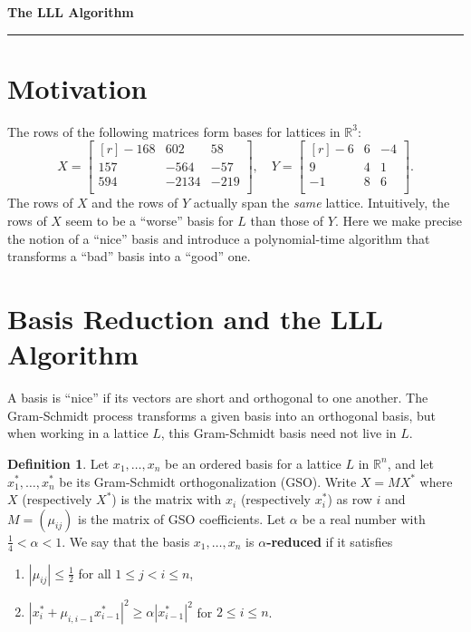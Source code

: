 \documentclass[11pt,letterpaper]{article}
\newcommand{\reals}{\mathbb{R}}
\theoremstyle{definition}
\newtheorem{definition}{Definition}[section]
\begin{document}
\begin{center}
{\bf \Large The LLL Algorithm} %
\vspace{0.2cm}
\hrule
\end{center}
%	
\section{Motivation}
The rows of the following matrices form bases for lattices in $\reals^3$:
\[
X = \begin{bmatrix*}[r]
	-168 & 602 & 58\\
	157 & -564 & -57\\
	594 & -2134 & -219\\
\end{bmatrix*}, \quad
Y = \begin{bmatrix*}[r]
	-6 & 6 & -4\\
	9 & 4 & 1\\
	-1 & 8 & 6\\
\end{bmatrix*}.
\]
The rows of $X$ and the rows of $Y$ actually span the \textit{same} lattice. Intuitively, the rows of $X$ seem to be a ``worse'' basis for $L$ than those of $Y$. Here we make precise the notion of a ``nice'' basis and introduce a polynomial-time algorithm that transforms a ``bad'' basis into a ``good'' one. 

\section{Basis Reduction and the LLL Algorithm}
A basis is ``nice'' if its vectors are short and orthogonal to one another. The Gram-Schmidt process transforms a given basis into an orthogonal basis, but when working in a lattice $L$, this Gram-Schmidt basis need not live in $L$.
\begin{definition}
	Let $x_1, \ldots, x_n$ be an ordered basis for a lattice $L$ in $\reals^n$, and let $x_1^*, \ldots, x_n^*$ be its Gram-Schmidt orthogonalization (GSO). Write $X = MX^*$ where $X$ (respectively $X^*$) is the matrix with $x_i$ (respectively $x_i^*$) as row $i$ and $M = (\mu_{ij})$ is the matrix of GSO coefficients. Let $\alpha$ be a real number with $\frac{1}{4}<\alpha<1$. We say that the basis $x_1, \ldots, x_n$ is \textbf{$\alpha$-reduced} if it satisfies
	\begin{enumerate}[(1)]
		\item $|\mu_{ij}|\leq \frac{1}{2}$ for all $1\leq j<i\leq n$,
		\item $|x_i^* + \mu_{i, i-1}x_{i-1}^*|^2 \geq \alpha|x_{i-1}^*|^2$ for $2\leq i\leq n$.
	\end{enumerate}
\end{definition}
\end{document}
